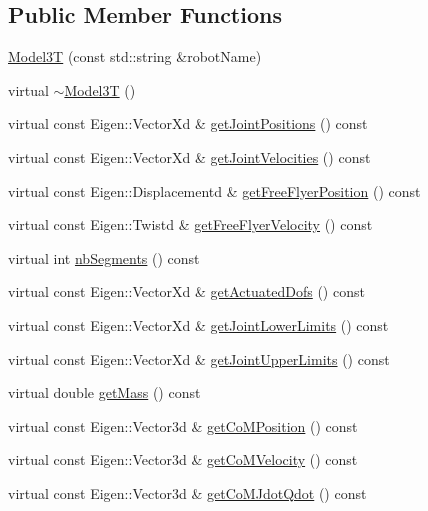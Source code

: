 \subsection*{Public Member Functions}
\begin{DoxyCompactItemize}
\item 
\hyperlink{classModel3T_afbcee4d1130a7020034027aafd9eecf6}{Model3T} (const std\+::string \&robot\+Name)
\item 
virtual \hyperlink{classModel3T_a6dedc34c9fefff7bd94d7c482eab04d1}{$\sim$\+Model3T} ()
\item 
virtual const Eigen\+::\+Vector\+Xd \& \hyperlink{classModel3T_a3a04fdc99c98e8d560863b7b7be3493d}{get\+Joint\+Positions} () const 
\item 
virtual const Eigen\+::\+Vector\+Xd \& \hyperlink{classModel3T_a126ac9ea68d130de311ccfc97df5dea5}{get\+Joint\+Velocities} () const 
\item 
virtual const Eigen\+::\+Displacementd \& \hyperlink{classModel3T_abef48875b8264e5d105bba79d7f6dd56}{get\+Free\+Flyer\+Position} () const 
\item 
virtual const Eigen\+::\+Twistd \& \hyperlink{classModel3T_a7bf24432701211addb8d4c714333c216}{get\+Free\+Flyer\+Velocity} () const 
\item 
virtual int \hyperlink{classModel3T_a9d586930c49e69baf571ed7ec9eef1f3}{nb\+Segments} () const 
\item 
virtual const Eigen\+::\+Vector\+Xd \& \hyperlink{classModel3T_ab2c745227612ca342f19265dbbada1c6}{get\+Actuated\+Dofs} () const 
\item 
virtual const Eigen\+::\+Vector\+Xd \& \hyperlink{classModel3T_a43a3f25d947bdebe4deebb8c8b1a2095}{get\+Joint\+Lower\+Limits} () const 
\item 
virtual const Eigen\+::\+Vector\+Xd \& \hyperlink{classModel3T_ae1787425348ef4f4390f3bd7bbb4101d}{get\+Joint\+Upper\+Limits} () const 
\item 
virtual double \hyperlink{classModel3T_a84e2555236e00630e182f06b5ea2fed7}{get\+Mass} () const 
\item 
virtual const Eigen\+::\+Vector3d \& \hyperlink{classModel3T_aff2537074c1d3ab5cf94489f456e0e64}{get\+Co\+M\+Position} () const 
\item 
virtual const Eigen\+::\+Vector3d \& \hyperlink{classModel3T_a9a7732427c5e86bf9b9d7c3b8d5cf9b6}{get\+Co\+M\+Velocity} () const 
\item 
virtual const Eigen\+::\+Vector3d \& \hyperlink{classModel3T_a9f1a3fe179738ee0b7bdb9b6f51693a3}{get\+Co\+M\+Jdot\+Qdot} () const 

\end{DoxyCompactItemize}
